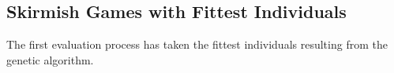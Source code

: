 \subsection{Skirmish Games with Fittest Individuals}
The first evaluation process has taken the fittest individuals resulting from the genetic algorithm. 
\begin{figure}[ht!]
\centering
    \quad
     \quad

\end{figure}
